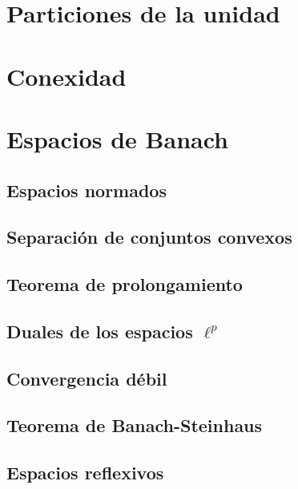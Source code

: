 \documentclass[12pt,]{krantz}
\theoremstyle{definition}
\theoremstyle{definition}
\theoremstyle{definition}
\theoremstyle{remark}
\begin{document}
\chapter{Particiones de la unidad}\label{particiones-de-la-unidad}

\chapter{Conexidad}\label{conexidad}

\chapter{Espacios de Banach}\label{espacios-de-banach}

\section{Espacios normados}\label{espacios-normados}

\section{Separación de conjuntos
convexos}\label{separacion-de-conjuntos-convexos-1}

\section{Teorema de prolongamiento}\label{teorema-de-prolongamiento}

\section{\texorpdfstring{Duales de los espacios
\(\ell^p\)}{Duales de los espacios \textbackslash{}ell\^{}p}}\label{duales-de-los-espacios-ellp}

\section{Convergencia débil}\label{convergencia-debil-1}

\section{Teorema de Banach-Steinhaus}\label{teorema-de-banach-steinhaus}

\section{Espacios reflexivos}\label{espacios-reflexivos}
\end{document}
